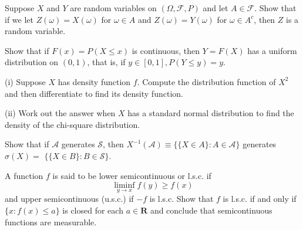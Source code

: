 \documentclass[en, normal, 11pt, black]{elegantnote}
\newenvironment{exercise}[1]{\begin{tcolorbox}[title=#1]}{\end{tcolorbox}}
\begin{document}
    \begin{exercise}{1.2.1}
        Suppose $X$ and $Y$ are random variables on $(\Omega, \mathcal{F}, P)$ and let $A \in \mathcal{F}$. Show that if we let $Z(\omega)=X(\omega)$ for $\omega \in A$ and $Z(\omega)=Y(\omega)$ for $\omega \in A^{c}$, then $Z$ is a random variable.
    \end{exercise}

    \begin{exercise}{1.2.4}
        Show that if $F(x)=P(X \leq x)$ is continuous, then $Y=F(X)$ has a uniform distribution on $(0,1)$, that is, if $y \in[0,1], P(Y \leq y)=y$.
    \end{exercise}

    \begin{exercise}{1.2.7}
        (i) Suppose $X$ has density function $f$. Compute the distribution function of $X^{2}$ and then differentiate to find its density function. 
        
        (ii) Work out the answer when $X$ has a standard normal distribution to find the density of the chi-square distribution. 
    \end{exercise}

    \begin{exercise}{1.3.1}
        Show that if $\mathcal{A}$ generates $\mathcal{S}$, then $X^{-1}(\mathcal{A}) \equiv\{\{X \in A\}: A \in \mathcal{A}\}$ generates $\sigma(X)=$ $\{\{X \in B\}: B \in \mathcal{S}\} .$
    \end{exercise}

    \begin{exercise}{1.3.5}
        A function $f$ is said to be lower semicontinuous or l.s.c. if
        $$
        \liminf _{y \rightarrow x} f(y) \geq f(x)
        $$
        and upper semicontinuous (u.s.c.) if $-f$ is l.s.c. Show that $f$ is l.s.c. if and only if $\{x: f(x) \leq a\}$ is closed for each $a \in \mathbf{R}$ and conclude that semicontinuous functions are measurable.
    \end{exercise}
    
\end{document}
